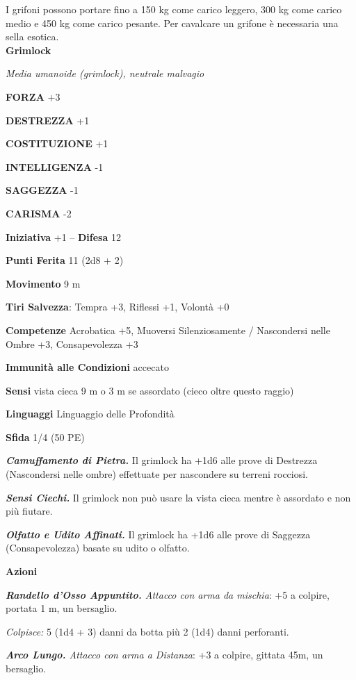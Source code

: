 \begin{multicols}{2}
I grifoni possono portare fino a 150 kg come carico leggero, 300 kg come carico medio e 450 kg come carico pesante. Per cavalcare un grifone è necessaria una sella esotica.\\


\medskip{}\textbf{Grimlock}

\emph{Media umanoide (grimlock), neutrale malvagio}

\textbf{FORZA} +3

\textbf{DESTREZZA} +1

\textbf{COSTITUZIONE} +1

\textbf{INTELLIGENZA} -1

\textbf{SAGGEZZA} -1

\textbf{CARISMA} -2

\textbf{Iniziativa} +1 -- \textbf{Difesa} 12

\textbf{Punti Ferita} 11 (2d8 + 2)

\textbf{Movimento} 9 m

\textbf{Tiri Salvezza}: Tempra +3, Riflessi +1, Volontà +0

\textbf{Competenze} Acrobatica +5, Muoversi Silenziosamente / Nascondersi nelle Ombre +3, Consapevolezza +3

\textbf{Immunità alle Condizioni} accecato

\textbf{Sensi} vista cieca 9 m o 3 m se assordato (cieco oltre questo raggio) 

\textbf{Linguaggi} Linguaggio delle Profondità

\textbf{Sfida} 1/4 (50 PE)

\emph{\textbf{Camuffamento di Pietra.}} Il grimlock ha +1d6 alle prove di Destrezza (Nascondersi nelle ombre) effettuate per nascondere su terreni rocciosi.

\emph{\textbf{Sensi Ciechi.}} Il grimlock non può usare la vista cieca mentre è assordato e non più fiutare.

\emph{\textbf{Olfatto e Udito Affinati.}} Il grimlock ha +1d6 alle prove di Saggezza (Consapevolezza) basate su udito o olfatto. 

\textbf{Azioni}

\emph{\textbf{Randello d'Osso Appuntito.} Attacco con arma da mischia}:
+5 a colpire, portata 1 m, un bersaglio.

\emph{Colpisce:} 5 (1d4 + 3) danni da botta più 2 (1d4) danni perforanti.

\emph{\textbf{Arco Lungo.} Attacco con arma a Distanza}: +3 a colpire, gittata 45m, un bersaglio.


\end{multicols}
